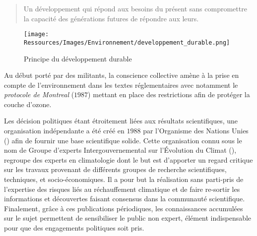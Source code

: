 \blockquote{
    Un développement qui répond aux besoins du présent sans
    compromettre la capacité des générations futures de répondre aux leurs.
}

\begin{figure}
    \centering
    \texttt{[image: Ressources/Images/Environnement/developpement\_durable.png]}
    \caption[Principe du développement durable]
            {Principe du développement durable \protect\footnotemark}
    \label{fig:developpement_durable}
\end{figure}

Au début porté par des militants, la conscience collective amène à la prise en compte de
l’environnement dans les textes réglementaires avec notamment le \textit{protocole de
Montreal} ($1987$) mettant en place des restrictions afin de protéger la couche d’ozone.

Les décision politiques étant étroitement liées aux résultats scientifiques,
une organisation indépendante a été créé en $1988$ par l’Organisme des Nations
Unies () afin de fournir une base scientifique solide. Cette organisation connu sous le nom de
Groupe d'experts Intergouvernemental sur l'Évolution du Climat (), regroupe
des experts en climatologie dont le but est d’apporter un regard critique sur
les travaux provenant de différents groupes de recherche scientifiques, techniques,
et socio-économiques. Il a pour but la réalisation sans parti-pris de l’expertise
des risques liés au réchauffement climatique et de faire re-sortir les informations
et découvertes faisant consensus dans la communauté scientifique. Finalement, grâce à ces
publications périodiques, les connaissances accumulées sur le sujet permettent de
sensibiliser le public non expert, élément indispensable pour que des engagements
politiques soit pris.

